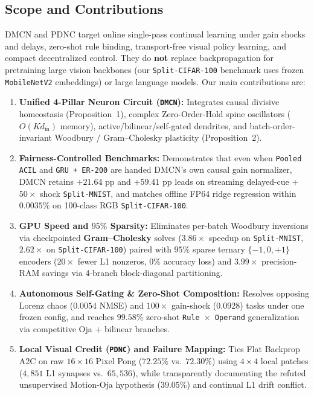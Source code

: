 \documentclass[11pt,a4paper]{article}
\begin{document}
\subsection{Scope and Contributions}
DMCN and PDNC target online single-pass continual learning under gain shocks and delays, zero-shot rule binding, transport-free visual policy learning, and compact decentralized control. They do \textbf{not} replace backpropagation for pretraining large vision backbones (our \texttt{Split-CIFAR-100} benchmark uses frozen \texttt{MobileNetV2} embeddings) or large language models. Our main contributions are:
\begin{enumerate}
    \item \textbf{Unified 4-Pillar Neuron Circuit (\texttt{DMCN}):} Integrates causal divisive homeostasis (Proposition~1), complex Zero-Order-Hold spine oscillators ($O(K d_{\text{in}})$ memory), active/bilinear/self-gated dendrites, and batch-order-invariant Woodbury / Gram--Cholesky plasticity (Proposition~2).
    \item \textbf{Fairness-Controlled Benchmarks:} Demonstrates that even when \texttt{Pooled ACIL} and \texttt{GRU + ER-200} are handed DMCN's own causal gain normalizer, DMCN retains $+21.64\text{ pp}$ and $+59.41\text{ pp}$ leads on streaming delayed-cue + $50\times$ shock \texttt{Split-MNIST}, and matches offline FP64 ridge regression within $0.0035\%$ on 100-class RGB \texttt{Split-CIFAR-100}.
    \item \textbf{GPU Speed and $95\%$ Sparsity:} Eliminates per-batch Woodbury inversions via checkpointed \textbf{Gram--Cholesky} solves ($3.86\times$ speedup on \texttt{Split-MNIST}, $2.62\times$ on \texttt{Split-CIFAR-100}) paired with $95\%$ sparse ternary $\{-1, 0, +1\}$ encoders ($20\times$ fewer L1 nonzeros, $0\%$ accuracy loss) and $3.99\times$ precision-RAM savings via 4-branch block-diagonal partitioning.
    \item \textbf{Autonomous Self-Gating \& Zero-Shot Composition:} Resolves opposing Lorenz chaos ($0.0054$ NMSE) and $100\times$ gain-shock ($0.0928$) tasks under one frozen config, and reaches $99.58\%$ zero-shot \texttt{Rule $\times$ Operand} generalization via competitive Oja + bilinear branches.
    \item \textbf{Local Visual Credit (\texttt{PDNC}) and Failure Mapping:} Ties Flat Backprop A2C on raw $16\times 16$ Pixel Pong ($72.25\%$ vs.\ $72.30\%$) using $4\times 4$ local patches ($4{,}851$ L1 synapses vs.\ $65{,}536$), while transparently documenting the refuted unsupervised Motion-Oja hypothesis ($39.05\%$) and continual L1 drift conflict.
\end{enumerate}
\end{document}
